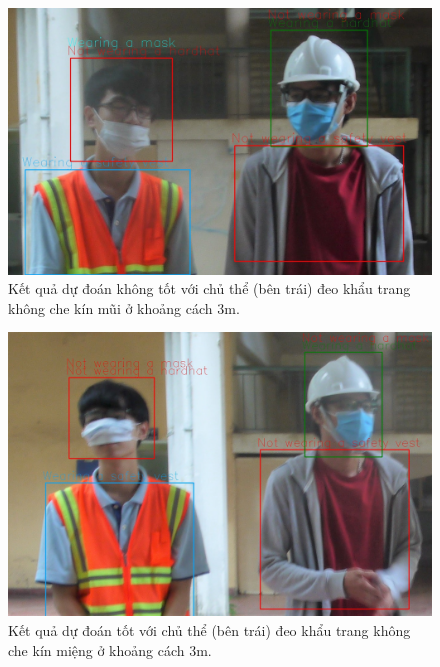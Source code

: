 \begin{figure}[ht!]
	\centerline{\includegraphics[scale=0.3]{images/bad_mask_nose_pred.jpg}}
  	\caption{Kết quả dự đoán không tốt với chủ thể (bên trái) đeo khẩu trang không che kín mũi ở khoảng cách 3m.}
  	\label{fig:bad_mask_nose_pred}
\end{figure}
\begin{figure}[ht!]
	\centerline{\includegraphics[scale=0.3]{images/bad_mask_mouth_pred.jpg}}
  	\caption{Kết quả dự đoán tốt với chủ thể (bên trái) đeo khẩu trang không che kín miệng ở khoảng cách 3m.}
  	\label{fig:bad_mask_mouth_pred}
\end{figure}


